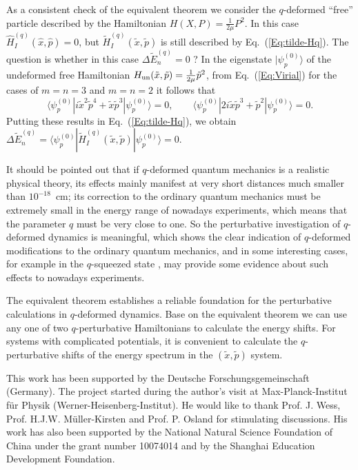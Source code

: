 \documentclass[a4paper,12pt]{article}
\begin{document}
As a consistent check of the  equivalent theorem we consider the  
$q$-deformed ``free'' particle described by the Hamiltonian 
$H(X,P)=\frac{1}{2\mu}P^2$.
In this case $\hat H^{(q)}_I(\hat x,\hat p)=0$, but 
$\tilde H^{(q)}_I(\tilde x,\tilde p)$ is still described by 
Eq.~(\ref{Eq:tilde-Hq}). The question is whether in this case
 $\Delta\tilde E^{(q)}_n=0$ ? In the eigenstate $|\psi_p^{(0)}\rangle$
of the undeformed free Hamiltonian
 $H_{\rm un}(\tilde x,\tilde p)=\frac{1}{2\mu}\tilde p^{2}$, from
Eq.~(\ref{Eq:Virial}) for the cases of $m=n=3$ and $m=n=2$  it follows that
\begin{equation}
\langle \psi_p^{(0)}|i\tilde x^2\tilde p^4
+ \tilde x\tilde p^3 |\psi_p^{(0)}\rangle =0, \qquad
\langle \psi_p^{(0)}|2i\tilde x\tilde p^3
+ \tilde p^2 |\psi_p^{(0)}\rangle =0. \nonumber
\end{equation}
Putting these results in Eq.~(\ref{Eq:tilde-Hq}), we obtain 
 $\Delta\tilde E^{(q)}_n = \langle \psi_p^{(0)}|
 \tilde H^{(q)}_I(\tilde x,\tilde p)|\psi_p^{(0)}\rangle = 0.$

It should be pointed out that if $q$-deformed quantum mechanics is
 a realistic physical theory, its effects mainly manifest at very short
 distances much smaller than $10^{-18}$~cm; 
its correction to the ordinary quantum mechanics must be extremely small
 in the energy range of nowadays experiments, 
which means that the parameter $q$ must be very close to one.
So the perturbative investigation of  $q$-deformed dynamics is meaningful,
 which shows the  clear indication of $q$-deformed modifications 
to the ordinary quantum mechanics, and in some interesting cases, for example 
in the $q$-squeezed state \cite{OZ00},  may provide some evidence about 
such effects to nowadays experiments.

The equivalent theorem establishes  a reliable foundation for  the
 perturbative calculations in  $q$-deformed dynamics.
  Base on the equivalent theorem we can use any one of  two $q$-perturbative 
Hamiltonians to calculate the energy  shifts. For systems  with 
complicated potentials, it is convenient to calculate 
the $q$-perturbative shifts of the energy spectrum in  the 
$(\tilde x,\tilde p)$ system.

\vspace{0.4cm}
  This work has been supported by the Deutsche Forschungsgemeinschaft 
(Germany). The project started during the author's visit at 
Max-Planck-Institut f\"ur Physik (Werner-Heisenberg-Institut).
 He would like to thank Prof. J. Wess, Prof. H.J.W. M\"uller-Kirsten
 and Prof. P. Osland for stimulating discussions.
 His work has also been supported by the National Natural Science 
Foundation of China under the grant number 10074014 and by the Shanghai 
Education Development Foundation. 
\end{document}
